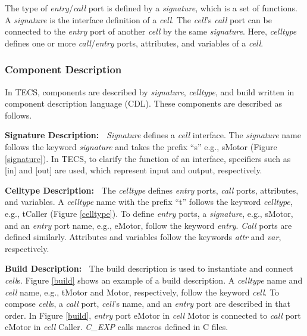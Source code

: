 \documentclass[conference]{IEEEtran/IEEEtran/IEEEtran}
\begin{document}
The type of {\it entry}/{\it call} port is defined by a {\it signature}, which is a set of functions.
A {\it signature} is the interface definition of a {\it cell}.
The {\it cell}'s  {\it call} port can be connected to the {\it entry} port of another {\it cell} by the same {\it signature}.
Here, {\it celltype} defines one or more {\it call}/{\it entry} ports, attributes, and variables of a {\it cell}.


\subsubsection{Component Description}
In TECS, components are described by {\it signature}, {\it celltype}, and build written in component description language (CDL).
These components are described as follows.

    {\bf Signature Description:\ }%
        {\it Signature} defines a {\it cell} interface.
        The {\it signature} name follows the keyword {\it signature} and takes the prefix ``s'' e.g., sMotor (Figure \ref{signature}).
        In TECS, to clarify the function of an interface, specifiers such as [in] and [out] are used, which represent input and output, respectively.

    {\bf Celltype Description:\ }%
        The {\it celltype} defines {\it entry} ports, {\it call} ports, attributes, and variables.
        A {\it celltype} name with the prefix ``t'' follows the keyword {\it celltype}, e.g., tCaller (Figure \ref{celltype}).
        To define {\it entry} ports, a {\it signature}, e.g., sMotor, and an {\it entry} port name, e.g., eMotor, follow the keyword {\it entry}.
        {\it Call} ports are defined similarly.
        Attributes and variables follow the keywords {\it attr} and {\it var}, respectively.
    
    {\bf Build Description:\ }%
        The build description is used to instantiate and connect {\it cell}s.
        Figure \ref{build} shows an example of a build description.
        A {\it celltype} name and {\it cell} name, e.g., tMotor and Motor, respectively, follow the keyword {\it cell}.
        To compose {\it cell}s, a {\it call} port, {\it cell}'s name, and an {\it entry} port are described in that order.
        In Figure \ref{build}, {\it entry} port eMotor in {\it cell} Motor is connected to {\it call} port cMotor in {\it cell} Caller.
        {\it C\_EXP} calls macros defined in C files.
        
\end{document}
